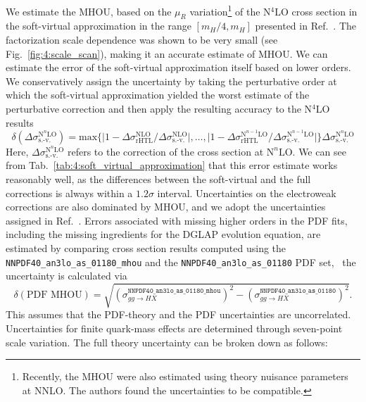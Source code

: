 We estimate the \acs{MHOU}, based on the $\mu_R$ variation\footnote{Recently, the \acs{MHOU} were also estimated using theory nuisance parameters~\cite{Lim:2024nsk} at \acs{NNLO}. The authors found the uncertainties to be compatible.} of the N${}^4$LO cross section in the soft-virtual approximation in the range $[m_H/4, m_H]$ presented in Ref.~\cite{Das:2020adl}. The factorization scale dependence was shown to be very small (see Fig.~\ref{fig:4:scale_scan}), making it an accurate estimate of \acs{MHOU}. We can estimate the error of the soft-virtual approximation itself based on lower orders. We conservatively assign the uncertainty by taking the perturbative order at which the soft-virtual approximation yielded the worst estimate of the perturbative correction and then apply the resulting accuracy to the N${}^4$LO results
\begin{equation}
\delta(\Delta  \sigma^{\text{N}^n\text{LO}}_{\text{s.-v.}}) =  \text{max} \Big \lbrace \Big | 1 - \Delta \sigma^{\text{NLO}}_\text{rHTL}/ \Delta \sigma^{\text{NLO}}_{\text{s.-v.}} \Big |,\ldots,  \Big | 1 - \Delta \sigma^{\text{N}^{n-1}\text{LO}}_\text{rHTL}/\Delta \sigma^{\text{N}^{n-1}\text{LO}}_{\text{s.-v.}} \Big | \Big \rbrace \Delta  \sigma^{\text{N}^n\text{LO}}_{\text{s.-v.}}
\label{eq:6:SV_error_estimate}
\end{equation}
Here, $\Delta \sigma^{\text{N}^n\text{LO}}_{\text{s.-v.}}$ refers to the correction of the cross section at $\text{N}^n\text{LO}$. We can see from Tab.~\ref{tab:4:soft_virtual_approximation} that this error estimate works reasonably well, as the differences between the soft-virtual and the full corrections is always within a $1.2 \sigma$ interval.
Uncertainties on the electroweak corrections are also dominated by \acs{MHOU}, and we adopt the uncertainties assigned in Ref.~\cite{Becchetti:2020wof}. Errors associated with missing higher orders in the \acs{PDF} fits, including the missing ingredients for the DGLAP evolution equation, are estimated by comparing cross section results computed using the \texttt{NNPDF40\_an3lo\_as\_01180\_mhou} and the \texttt{NNPDF40\_an3lo\_as\_01180} \acs{PDF} set, \ie\ the uncertainty is calculated via
\begin{equation}
\delta (\text{PDF MHOU}) = \sqrt{\left(\sigma_{gg \rightarrow HX}^\mathtt{NNPDF40\_an3lo\_as\_01180\_mhou} \right)^2 - \left(\sigma_{gg \rightarrow HX}^\mathtt{NNPDF40\_an3lo\_as\_01180} \right)^2}.
\end{equation}
This assumes that the \acs{PDF}-theory and the \acs{PDF} uncertainties are uncorrelated. Uncertainties for finite quark-mass effects are determined through seven-point scale variation. The full theory uncertainty can be broken down as follows:
